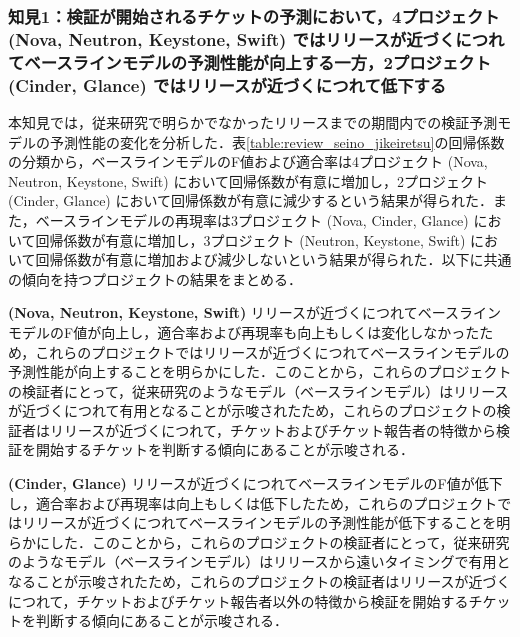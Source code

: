 \documentclass[11pt]{jreport}
\begin{document}
\subsubsection{知見1：検証が開始されるチケットの予測において，4プロジェクト (Nova, Neutron, Keystone, Swift) ではリリースが近づくにつれてベースラインモデルの予測性能が向上する一方，2プロジェクト (Cinder, Glance) ではリリースが近づくにつれて低下する}
本知見では，従来研究\cite{prioritizer}で明らかでなかったリリースまでの期間内での検証予測モデルの予測性能の変化を分析した．表\ref{table:review_seino_jikeiretsu}の回帰係数の分類から，ベースラインモデルのF値および適合率は4プロジェクト (Nova, Neutron, Keystone, Swift) において回帰係数が有意に増加し，2プロジェクト (Cinder, Glance) において回帰係数が有意に減少するという結果が得られた．また，ベースラインモデルの再現率は3プロジェクト (Nova, Cinder, Glance) において回帰係数が有意に増加し，3プロジェクト (Neutron, Keystone, Swift) において回帰係数が有意に増加および減少しないという結果が得られた．以下に共通の傾向を持つプロジェクトの結果をまとめる．

\textbf{ (Nova, Neutron, Keystone, Swift) }リリースが近づくにつれてベースラインモデルのF値が向上し，適合率および再現率も向上もしくは変化しなかったため，これらのプロジェクトではリリースが近づくにつれてベースラインモデルの予測性能が向上することを明らかにした．このことから，これらのプロジェクトの検証者にとって，従来研究\cite{prioritizer}のようなモデル（ベースラインモデル）はリリースが近づくにつれて有用となることが示唆されたため，これらのプロジェクトの検証者はリリースが近づくにつれて，チケットおよびチケット報告者の特徴から検証を開始するチケットを判断する傾向にあることが示唆される．

\textbf{ (Cinder, Glance) }リリースが近づくにつれてベースラインモデルのF値が低下し，適合率および再現率は向上もしくは低下したため，これらのプロジェクトではリリースが近づくにつれてベースラインモデルの予測性能が低下することを明らかにした．このことから，これらのプロジェクトの検証者にとって，従来研究\cite{prioritizer}のようなモデル（ベースラインモデル）はリリースから遠いタイミングで有用となることが示唆されたため，これらのプロジェクトの検証者はリリースが近づくにつれて，チケットおよびチケット報告者以外の特徴から検証を開始するチケットを判断する傾向にあることが示唆される．

\end{document}
